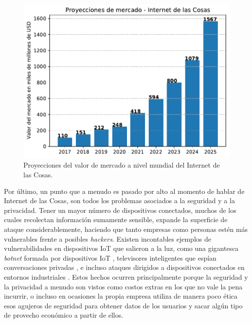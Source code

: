 \begin{figure}[h]
\centering
\includegraphics[width=\textwidth]{./Figures/iot_market_projection.pdf}
\caption[Proyecciones del valor de mercado a nivel mundial del Internet de las Cosas.]{Proyecciones del valor de mercado a nivel mundial del Internet de las Cosas.\footnotemark}
\label{fig:iot_market}
\end{figure}



Por último, un punto que a menudo es pasado por alto al momento de hablar de Internet de las Cosas, son todos los problemas asociados a la seguridad y a la privacidad. Tener un mayor número de dispositivos conectados, muchos de los cuales recolectan información sumamente sensible, expande la superficie de ataque considerablemente, haciendo que tanto empresas como personas estén más vulnerables frente a posibles \emph{hackers}. Existen incontables ejemplos de vulnerabilidades en dispositivos IoT que salieron a la luz, como una gigantesca \emph{botnet} formada por dispositivos IoT \citep{3}, televisores inteligentes que espían conversaciones privadas \citep{4}, e incluso ataques dirigidos a dispositivos conectados en entornos industriales \citep{5}. Estos hechos ocurren principalmente porque la seguridad y la privacidad a menudo son vistos como costos extras en los que no vale la pena incurrir, o incluso en ocasiones la propia empresa utiliza de manera poco ética esos agujeros de seguridad para obtener datos de los usuarios y sacar algún tipo de provecho económico a partir de ellos.

